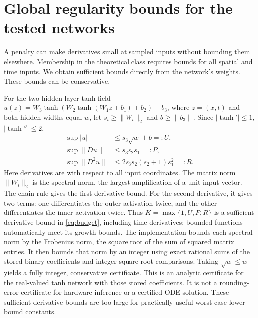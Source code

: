 \section{Global regularity bounds for the tested networks}
\label{app:network-budgets}
A penalty can make derivatives small at sampled inputs without bounding
them elsewhere. Membership in the theoretical class requires bounds for
all spatial and time inputs. We obtain sufficient bounds directly from
the network's weights. These bounds can be conservative.\AIassistance

For the two-hidden-layer tanh field
$u(z)=W_3\tanh(W_2\tanh(W_1z+b_1)+b_2)+b_3$, where $z=(x,t)$ and
both hidden widths equal $w$, let $s_i\ge\|W_i\|_2$ and
$b\ge\|b_3\|$. Since $|\tanh'|\le1$, $|\tanh''|\le2$,
\begin{align}
 \sup|u|&\le s_3\sqrt w+b=:U,\\
 \sup\|Du\|&\le s_3s_2s_1=:P,\\
 \sup\|D^2u\|&\le2s_3s_2(s_2+1)s_1^2=:R.
 \label{eq:network-budget}
\end{align}
Here derivatives are with respect to all input coordinates. The matrix norm
$\|W_i\|_2$ is the spectral norm, the largest amplification of a unit input
vector. The chain rule gives the first-derivative bound. For the second derivative,
it gives two terms: one differentiates the outer activation twice, and the
other differentiates the inner activation twice. Thus
$K=\max\{1,U,P,R\}$ is a sufficient derivative bound in \eqref{eq:budget}, including
time derivatives; bounded functions automatically meet its growth bounds.
The implementation bounds each spectral norm by the Frobenius norm, the
square root of the sum of squared matrix entries. It then bounds that norm
by an integer using exact rational sums of the
stored binary coefficients and integer square-root comparisons. Taking
$\sqrt w\le w$ yields a fully integer, conservative certificate. This is
an analytic certificate for the real-valued tanh network with those stored
coefficients. It is not a rounding-error certificate for hardware inference
or a certified ODE solution. These sufficient derivative bounds are too large for practically useful
worst-case lower-bound constants.
